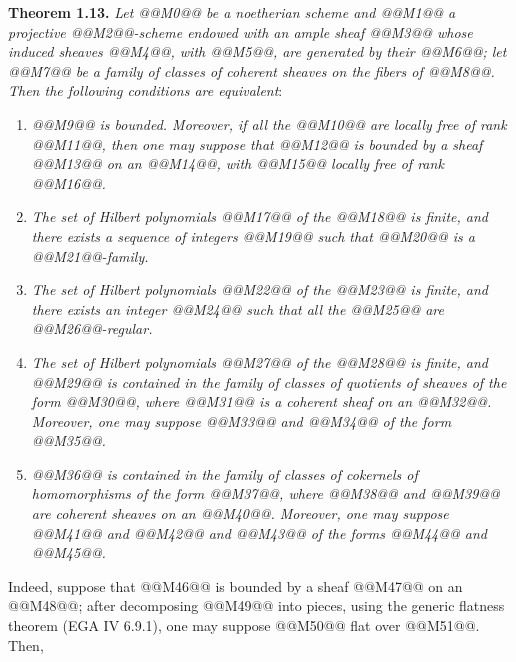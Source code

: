 \textbf{Theorem 1.13.}
\emph{Let @@M0@@ be a noetherian scheme and @@M1@@ a projective @@M2@@-scheme endowed with an ample sheaf @@M3@@ whose induced sheaves @@M4@@, with @@M5@@, are generated by their @@M6@@; let @@M7@@ be a family of classes of coherent sheaves on the fibers of @@M8@@. Then the following conditions are equivalent}:
\begin{enumerate}[label=(\roman*)]
\item \emph{@@M9@@ is bounded. Moreover, if all the @@M10@@ are locally free of rank @@M11@@, then one may suppose that @@M12@@ is bounded by a sheaf @@M13@@ on an @@M14@@, with @@M15@@ locally free of rank @@M16@@.}
\item \emph{The set of Hilbert polynomials @@M17@@ of the @@M18@@ is finite, and there exists a sequence of integers @@M19@@ such that @@M20@@ is a @@M21@@-family.}
\item \emph{The set of Hilbert polynomials @@M22@@ of the @@M23@@ is finite, and there exists an integer @@M24@@ such that all the @@M25@@ are @@M26@@-regular.}
\item \emph{The set of Hilbert polynomials @@M27@@ of the @@M28@@ is finite, and @@M29@@ is contained in the family of classes of quotients of sheaves of the form @@M30@@, where @@M31@@ is a coherent sheaf on an @@M32@@. Moreover, one may suppose @@M33@@ and @@M34@@ of the form @@M35@@.}
\item \emph{@@M36@@ is contained in the family of classes of cokernels of homomorphisms of the form @@M37@@, where @@M38@@ and @@M39@@ are coherent sheaves on an @@M40@@. Moreover, one may suppose @@M41@@ and @@M42@@ and @@M43@@ of the forms @@M44@@ and @@M45@@.}
\end{enumerate}
Indeed, suppose that @@M46@@ is bounded by a sheaf @@M47@@ on an @@M48@@; after decomposing @@M49@@ into pieces, using the generic flatness theorem (EGA IV 6.9.1), one may suppose @@M50@@ flat over @@M51@@. Then,
